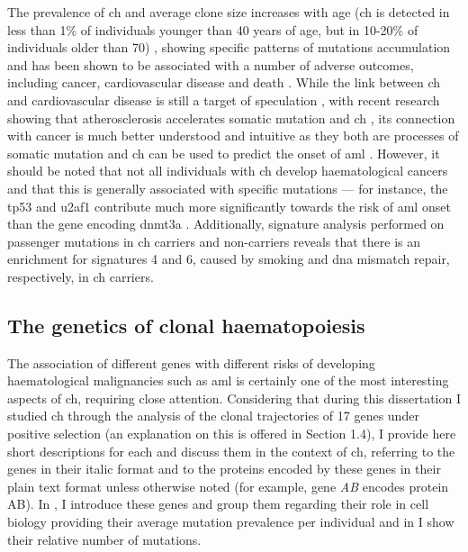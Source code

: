 The prevalence of \ac{ch} and average clone size increases with age (\ac{ch} is detected in less than 1\% of individuals younger than 40 years of age, but in 10-20\% of individuals older than 70) \cite{Jaiswal2014-rl}, showing specific patterns of mutations accumulation \cite{McKerrell2015-rl} and has been shown to be associated with a number of adverse outcomes, including cancer, cardiovascular disease and death \cite{Jaiswal2014-rl,Saleheen2017-eq,Genovese2014-eu,Desai2018-pj,Abelson2018-wh}. While the link between \ac{ch} and cardiovascular disease is still a target of speculation \cite{Evans2021-ae}, with recent research showing that atherosclerosis accelerates somatic mutation and \ac{ch} \cite{Heyde2021-nl}, its connection with cancer is much better understood and intuitive as they both are processes of somatic mutation and \ac{ch} can be used to predict the onset of \ac{aml} \cite{Desai2018-pj,Abelson2018-wh}. However, it should be noted that not all individuals with \ac{ch} develop haematological cancers and that this is generally associated with specific mutations --- for instance, the \ac{tp53} and \ac{u2af1} contribute much more significantly towards the risk of \ac{aml} onset than the gene encoding \ac{dnmt3a} \cite{Abelson2018-wh}. Additionally, signature analysis performed on passenger mutations in \ac{ch} carriers and non-carriers reveals that there is an enrichment for signatures 4 and 6, caused by smoking and \ac{dna} mismatch repair, respectively, in \ac{ch} carriers.

\subsection{The genetics of clonal haematopoiesis}

The association of different genes with different risks of developing haematological malignancies such as \ac{aml} is certainly one of the most interesting aspects of \ac{ch}, requiring close attention. Considering that during this dissertation I studied \ac{ch} through the analysis of the clonal trajectories of 17 genes under positive selection (an explanation on this is offered in Section 1.4), I provide here short descriptions for each and discuss them in the context of \ac{ch}, referring to the genes in their italic format and to the proteins encoded by these genes in their plain text format unless otherwise noted (for example, gene \textit{AB} encodes protein AB). In , I introduce these genes and group them regarding their role in cell biology providing their average mutation prevalence per individual and in  I show their relative number of mutations.

